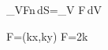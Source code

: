 \oiint_{\partial V}\mathbf F\cdot\mathbf n\,dS=\iiint_V \nabla\cdot\mathbf F\,dV

\mathbf F=(kx,ky) \quad\Longrightarrow\quad \nabla\cdot\mathbf F=2k
